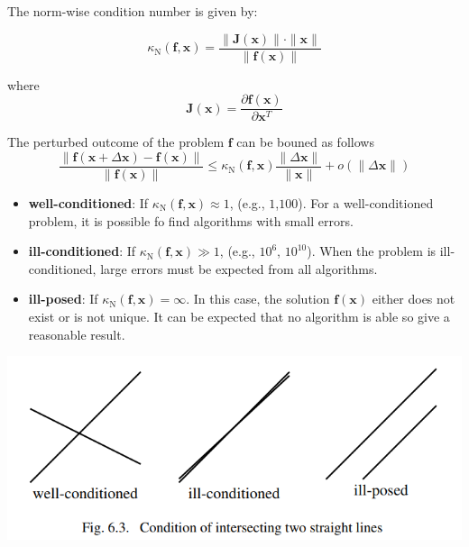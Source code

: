 \documentclass[english]{latex4ei/latex4ei_sheet}
\begin{document}
\begin{sectionbox}
The norm-wise condition number is given by:

$$\kappa_\text{N}(\mathbf{f}, \mathbf{x}) = \frac{\parallel \mathbf{J}(\mathbf{x})\parallel \cdot \parallel \mathbf{x} \parallel}{\parallel \mathbf{f}(\mathbf{x})\parallel}$$

where
$$\mathbf{J}(\mathbf{x}) = \frac{\partial \mathbf{f}(\mathbf{x})}{\partial\mathbf{x}^T}$$

The perturbed outcome of the problem $\mathbf{f}$ can be bouned as follows
$$\frac{\parallel \mathbf{f}(\mathbf{x}+\Delta \mathbf{x}) - \mathbf{f}(\mathbf{x})\parallel}{\parallel \mathbf{f}(\mathbf{x})\parallel} \leq \kappa_\text{N}(\mathbf{f}, \mathbf{x}) \frac{\parallel\Delta \mathbf{x} \parallel}{\parallel \mathbf{x}\parallel} + o(\parallel \Delta \mathbf{x} \parallel)$$
\begin{itemize}
\item \textbf{well-conditioned}: If $\kappa_\text{N}(\mathbf{f}, \mathbf{x}) \approx 1$, (e.g., $1$,$100$). For a well-conditioned problem, it is possible fo find algorithms with small errors.
\item \textbf{ill-conditioned}: If $\kappa_\text{N}(\mathbf{f}, \mathbf{x}) \gg 1$, (e.g., $10^6$, $10^10$). When the problem is ill-conditioned, large errors must be expected from all algorithms.
\item \textbf{ill-posed}: If $\kappa_\text{N}(\mathbf{f}, \mathbf{x}) = \infty$. In this case, the solution $\mathbf{f}(\mathbf{x})$ either does not exist or is not unique. It can be expected that no algorithm is able so give a reasonable result.
\end{itemize}
\end{sectionbox}
\begin{sectionbox}
\includegraphics[width=\textwidth]{img/conditions_graphics.PNG}
\end{sectionbox}
\end{document}
